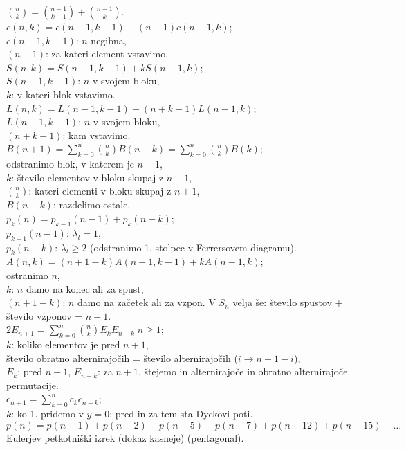 \documentclass[a4paper, 12pt]{book}
\theoremstyle{definition}
\theoremstyle{remark}
\begin{document}
$\binom{n}{k} = \binom{n-1}{k-1} + \binom{n-1}{k}$. \\
$c(n,k) = c(n-1,k-1) + (n-1) c(n-1,k)$; \\
$c(n-1,k-1)$: $n$ negibna, \\
$(n-1)$: za kateri element vstavimo. \\
$S(n,k) = S(n-1,k-1) + k S(n-1,k)$; \\
$S(n-1,k-1)$: $n$ v svojem bloku, \\
$k$: v kateri blok vstavimo. \\
$L(n,k) = L(n-1,k-1) + (n+k-1) L(n-1,k)$; \\
$L(n-1,k-1)$: $n$ v svojem bloku, \\
$(n+k-1)$: kam vstavimo. \\
$B(n+1) = \sum_{k=0}^{n} \binom{n}{k} B(n-k) = \sum_{k=0}^{n} \binom{n}{k} B(k)$; \\
odstranimo blok, v katerem je $n+1$, \\
$k$: število elementov v bloku skupaj z $n+1$, \\
$\binom{n}{k}$: kateri elementi v bloku skupaj z $n+1$, \\
$B(n-k)$: razdelimo ostale. \\
$p_k(n) = p_{k-1}(n-1) + p_k(n-k)$; \\
$p_{k-1}(n-1)$: $\lambda_l = 1$, \\
$p_k(n-k)$: $\lambda_l \geq 2$ (odstranimo 1. stolpec v Ferrersovem diagramu). \\
$A(n,k) = (n+1-k) A(n-1,k-1) + k A(n-1,k)$; \\
ostranimo $n$, \\
$k$: $n$ damo na konec ali za spust, \\
$(n+1-k)$: $n$ damo na začetek ali za vzpon.
V $S_n$ velja še: število spustov + število vzponov = $n-1$. \\
$2 E_{n+1} = \sum_{k=0}^{n} \binom{n}{k} E_k E_{n-k} \; n \geq 1$; \\
$k$: koliko elementov je pred $n+1$, \\
število obratno alternirajočih = število alternirajočih ($i \to n+1-i$), \\
$E_k$: pred $n+1$, $E_{n-k}$: za $n+1$, štejemo in alternirajoče in obratno alternirajoče permutacije. \\
$c_{n+1} = \sum_{k=0}^{n} c_k c_{n-k}$; \\
$k$: ko 1. pridemo v $y=0$: pred in za tem sta Dyckovi poti. \\
$p(n) = p(n-1) + p(n-2) - p(n-5) - p(n-7) + p(n-12) + p(n-15) - \dots$ \\
Eulerjev petkotniški izrek (dokaz kasneje) (pentagonal).
\end{document}
